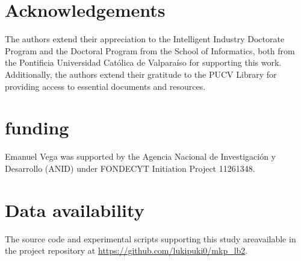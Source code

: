 \documentclass[review]{elsarticle}
\begin{document}
\section*{Acknowledgements}
The authors extend their appreciation to the Intelligent Industry Doctorate Program and the Doctoral Program from the School of Informatics, both from the Pontificia Universidad Católica de Valparaíso for supporting this work. Additionally, the authors extend their gratitude to the PUCV Library for providing access to essential documents and resources.

\section*{funding} Emanuel Vega was supported by the Agencia Nacional de Investigación y Desarrollo (ANID) under FONDECYT Initiation Project 11261348.


\section*{Data availability}
The source code and experimental scripts supporting this study areavailable in the project repository at \url{https://github.com/lukipuki0/mkp_lb2}.

\end{document}
